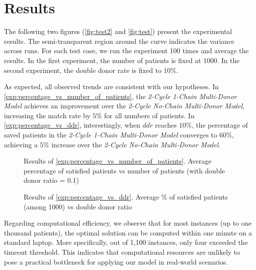 \section{Results}


The following two figures (\autoref{fig:test2} and \autoref{fig:test}) present the experimental results. The semi-transparent region around the curve indicates the variance across runs. For each test case, we run the experiment 100 times and average the results.
In the first experiment, the number of patients is fixed at 1000. In the second experiment, the double donor rate is fixed to $10\%$.

As expected, all observed trends are consistent with our hypotheses. In \autoref{exp:percentage_vs_number_of_patients}, the \textit{2-Cycle 1-Chain Multi-Donor Model} achieves an improvement over the \textit{2-Cycle No-Chain Multi-Donor Model}, increasing the match rate by $5\%$ for all numbers of patients. In \autoref{exp:percentage_vs_ddr}, interestingly, when $ddr$ reaches $10\%$, the percentage of saved patients in the \textit{2-Cycle 1-Chain Multi-Donor Model} converges to $60\%$, achieving a $5\%$ increase over the \textit{2-Cycle No-Chain Multi-Donor Model}.

\begin{figure}[H]
    \centering
    
    \caption[Average percentage of satisfied patients vs number of patients (with double donor ratio = 0.1)]{Results of \autoref{exp:percentage_vs_number_of_patients}. Average percentage of satisfied patients vs number of patients (with double donor ratio = 0.1)}
    \label{fig:test2}
\end{figure}

\begin{figure}[H]
    \centering
    
    \caption[Average \% of satisfied patients (among 1000) vs double donor ratio]{Results of \autoref{exp:percentage_vs_ddr}. Average \% of satisfied patients  (among 1000) vs double donor ratio}
    \label{fig:test}
\end{figure}


Regarding computational efficiency, we observe that for most instances (up to one thousand patients), the optimal solution can be computed within one minute on a standard laptop. More specifically, out of 1,100 instances, only four exceeded the timeout threshold. This indicates that computational resources are unlikely to pose a practical bottleneck for applying our model in real-world scenarios.


